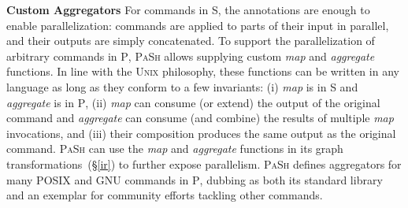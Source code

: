 \documentclass[sigplan, review, screen, anonymous]{acmart}
\newcommand{\heading}[1]{\vspace{4pt}\noindent\textbf{#1}\enspace}
\newcommand{\cn}[1]{\mbox{\textcircled{\footnotesize #1}}}
\newcommand{\sta}{\cn{\textsc{S}}\xspace}
\newcommand{\pur}{\cn{\textsc{P}}\xspace}
\newcommand{\nv}[1]{[{\color{cyan}nv: #1}]}
\newcommand{\kk}[1]{[{\color{magenta}kk: #1}]}
\newcommand{\tr}[1]{} %
\newcommand{\sx}[1]{(\S\ref{#1})}
\newcommand{\sys}{{\scshape PaSh}\xspace}
\newcommand{\unix}{{\scshape Unix}\xspace}
\begin{document}
\heading{Custom Aggregators}
For commands in \sta, the annotations are enough to enable parallelization:
  commands are applied to parts of their input in parallel, and their outputs are simply concatenated.
%
To support the parallelization of arbitrary commands in \pur, \sys allows supplying custom \emph{map} and \emph{aggregate} functions.
In line with the \unix philosophy, these functions can be written in any language as long as they conform to a few invariants:
  (i) \emph{map} is in \sta and \emph{aggregate} is in \pur,
  (ii) \emph{map} can consume (or extend) the output of the original command and  \emph{aggregate} can consume (and combine) the results of multiple \emph{map} invocations, and
  (iii) their composition produces the same output as the original command.
\sys can use the \emph{map} and \emph{aggregate} functions in its graph transformations~\sx{ir} to further expose parallelism.
\sys defines aggregators for many POSIX and GNU commands in \pur, dubbing as both its standard library and an exemplar for community efforts tackling other commands.



\tr{\kk{I am not sure a general interface is so easy to design. It needs
  more though. It might be beneficial to just talk about sort and wc
  here and how we implemented them and nothing more. Or maybe this
  could then go to the implementation? Or maybe say that one can write
  a Python function that given a node of the graph, transforms it into
  many. I am not sure what is best...}}


\tr{Can we find a solution for the commands in coreutils?}
\end{document}
